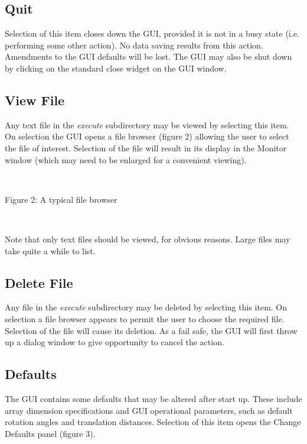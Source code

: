 \subsection{Quit}

Selection of this item closes down the GUI, provided it is not in a busy
state (i.e. performing some other action). No data saving results from
this action. Amendments to the GUI defaults will be lost. The GUI may
also be shut down by clicking on the standard close widget on the GUI
window. 

\subsection{View File}

Any text file in the {\em execute} subdirectory may be viewed by
selecting this item. On selection the GUI opens a file browser (figure
2) allowing the user to select the file of interest. Selection of the
file will result in its display in the Monitor window (which may need
to be enlarged for a convenient viewing).

~

\vskip 5mm
\centerline{}
\centerline{Figure 2: A typical file browser}
\vskip 5mm

~

\noindent
Note that only text files should be viewed, for obvious reasons. Large
files may take quite a while to list.

\subsection{Delete File}

Any file in the {\em execute} subdirectory may be deleted by selecting
this item. On selection a file browser appears to permit the user to
choose the required file. Selection of the file will cause its
deletion. As a fail safe, the GUI will first throw up a dialog window
to give opportunity to cancel the action.

\subsection{Defaults}

The GUI contains some defaults that may be altered after start up.  These
include array dimension specifications and GUI operational parameters, such as
default rotation angles and translation distances. Selection of this item
opens the Change Defaults panel (figure 3).

